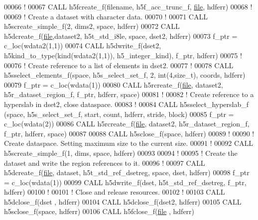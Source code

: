 \begin{DoxyCode}
00066   \textcolor{comment}{!}
00067   \textcolor{keyword}{CALL }h5fcreate\_f(filename, h5f\_acc\_trunc\_f, \hyperlink{structfile}{file}, hdferr)
00068   \textcolor{comment}{!}
00069   \textcolor{comment}{! Create a dataset with character data.}
00070   \textcolor{comment}{!}
00071   \textcolor{keyword}{CALL }h5screate\_simple\_f(2, dims2, space, hdferr)
00072   \textcolor{keyword}{CALL }h5dcreate\_f(\hyperlink{structfile}{file},dataset2, h5t\_std\_i8le, space, dset2, hdferr)
00073   f\_ptr = c\_loc(wdata2(1,1))
00074   \textcolor{keyword}{CALL }h5dwrite\_f(dset2, h5kind\_to\_type(kind(wdata2(1,1)), h5\_integer\_kind), f\_ptr, hdferr)
00075   \textcolor{comment}{!}
00076   \textcolor{comment}{! Create reference to a list of elements in dset2.}
00077   \textcolor{comment}{!}
00078   \textcolor{keyword}{CALL }h5sselect\_elements\_f(space, h5s\_select\_set\_f, 2, int(4,size\_t), coords, hdferr)
00079   f\_ptr = c\_loc(wdata(1))
00080   \textcolor{keyword}{CALL }h5rcreate\_f(\hyperlink{structfile}{file}, dataset2, h5r\_dataset\_region\_f, f\_ptr, hdferr, space)
00081   \textcolor{comment}{!}
00082   \textcolor{comment}{! Create reference to a hyperslab in dset2, close dataspace.}
00083   \textcolor{comment}{!}
00084   \textcolor{keyword}{CALL }h5sselect\_hyperslab\_f (space, h5s\_select\_set\_f, start, count, hdferr, stride, block)
00085   f\_ptr = c\_loc(wdata(2))
00086   \textcolor{keyword}{CALL }h5rcreate\_f(\hyperlink{structfile}{file}, dataset2, h5r\_dataset\_region\_f, f\_ptr, hdferr, space)
00087 
00088   \textcolor{keyword}{CALL }h5sclose\_f(space, hdferr)
00089   \textcolor{comment}{!}
00090   \textcolor{comment}{! Create dataspace.  Setting maximum size to the current size.}
00091   \textcolor{comment}{!}
00092   \textcolor{keyword}{CALL }h5screate\_simple\_f(1, dims, space, hdferr)
00093 
00094   \textcolor{comment}{!}
00095   \textcolor{comment}{! Create the dataset and write the region references to it.}
00096   \textcolor{comment}{!}
00097   \textcolor{keyword}{CALL }h5dcreate\_f(\hyperlink{structfile}{file}, dataset, h5t\_std\_ref\_dsetreg, space, dset, hdferr)
00098   f\_ptr = c\_loc(wdata(1))
00099   \textcolor{keyword}{CALL }h5dwrite\_f(dset, h5t\_std\_ref\_dsetreg, f\_ptr, hdferr)
00100   \textcolor{comment}{!}
00101   \textcolor{comment}{! Close and release resources.}
00102   \textcolor{comment}{!}
00103   \textcolor{keyword}{CALL }h5dclose\_f(dset , hdferr)
00104   \textcolor{keyword}{CALL }h5dclose\_f(dset2, hdferr)
00105   \textcolor{keyword}{CALL }h5sclose\_f(space, hdferr)
00106   \textcolor{keyword}{CALL }h5fclose\_f(\hyperlink{structfile}{file} , hdferr)

\end{DoxyCode}
